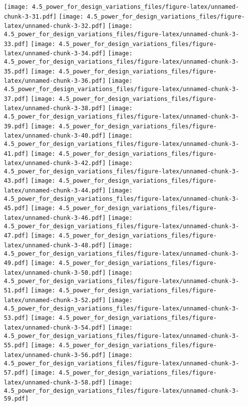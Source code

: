 \documentclass[]{article}
\begin{document}
\texttt{[image: 4.5\_power\_for\_design\_variations\_files/figure-latex/unnamed-chunk-3-31.pdf]}
\texttt{[image: 4.5\_power\_for\_design\_variations\_files/figure-latex/unnamed-chunk-3-32.pdf]}
\texttt{[image: 4.5\_power\_for\_design\_variations\_files/figure-latex/unnamed-chunk-3-33.pdf]}
\texttt{[image: 4.5\_power\_for\_design\_variations\_files/figure-latex/unnamed-chunk-3-34.pdf]}
\texttt{[image: 4.5\_power\_for\_design\_variations\_files/figure-latex/unnamed-chunk-3-35.pdf]}
\texttt{[image: 4.5\_power\_for\_design\_variations\_files/figure-latex/unnamed-chunk-3-36.pdf]}
\texttt{[image: 4.5\_power\_for\_design\_variations\_files/figure-latex/unnamed-chunk-3-37.pdf]}
\texttt{[image: 4.5\_power\_for\_design\_variations\_files/figure-latex/unnamed-chunk-3-38.pdf]}
\texttt{[image: 4.5\_power\_for\_design\_variations\_files/figure-latex/unnamed-chunk-3-39.pdf]}
\texttt{[image: 4.5\_power\_for\_design\_variations\_files/figure-latex/unnamed-chunk-3-40.pdf]}
\texttt{[image: 4.5\_power\_for\_design\_variations\_files/figure-latex/unnamed-chunk-3-41.pdf]}
\texttt{[image: 4.5\_power\_for\_design\_variations\_files/figure-latex/unnamed-chunk-3-42.pdf]}
\texttt{[image: 4.5\_power\_for\_design\_variations\_files/figure-latex/unnamed-chunk-3-43.pdf]}
\texttt{[image: 4.5\_power\_for\_design\_variations\_files/figure-latex/unnamed-chunk-3-44.pdf]}
\texttt{[image: 4.5\_power\_for\_design\_variations\_files/figure-latex/unnamed-chunk-3-45.pdf]}
\texttt{[image: 4.5\_power\_for\_design\_variations\_files/figure-latex/unnamed-chunk-3-46.pdf]}
\texttt{[image: 4.5\_power\_for\_design\_variations\_files/figure-latex/unnamed-chunk-3-47.pdf]}
\texttt{[image: 4.5\_power\_for\_design\_variations\_files/figure-latex/unnamed-chunk-3-48.pdf]}
\texttt{[image: 4.5\_power\_for\_design\_variations\_files/figure-latex/unnamed-chunk-3-49.pdf]}
\texttt{[image: 4.5\_power\_for\_design\_variations\_files/figure-latex/unnamed-chunk-3-50.pdf]}
\texttt{[image: 4.5\_power\_for\_design\_variations\_files/figure-latex/unnamed-chunk-3-51.pdf]}
\texttt{[image: 4.5\_power\_for\_design\_variations\_files/figure-latex/unnamed-chunk-3-52.pdf]}
\texttt{[image: 4.5\_power\_for\_design\_variations\_files/figure-latex/unnamed-chunk-3-53.pdf]}
\texttt{[image: 4.5\_power\_for\_design\_variations\_files/figure-latex/unnamed-chunk-3-54.pdf]}
\texttt{[image: 4.5\_power\_for\_design\_variations\_files/figure-latex/unnamed-chunk-3-55.pdf]}
\texttt{[image: 4.5\_power\_for\_design\_variations\_files/figure-latex/unnamed-chunk-3-56.pdf]}
\texttt{[image: 4.5\_power\_for\_design\_variations\_files/figure-latex/unnamed-chunk-3-57.pdf]}
\texttt{[image: 4.5\_power\_for\_design\_variations\_files/figure-latex/unnamed-chunk-3-58.pdf]}
\texttt{[image: 4.5\_power\_for\_design\_variations\_files/figure-latex/unnamed-chunk-3-59.pdf]}
\end{document}
